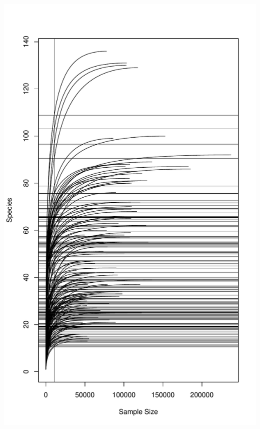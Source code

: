 \documentclass[
]{article}
\begin{document}
\includegraphics[width=1\linewidth]{manuscript_template_files/figure-latex/unnamed-chunk-24-1}
\end{document}
